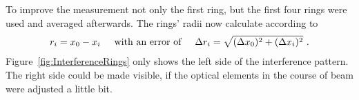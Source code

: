 To improve the measurement not only the first ring, but the first four rings were used and averaged afterwards.
The rings' radii now calculate according to
\begin{align}
	r_i = x_0 - x_i \hspace{0.5cm} \text{with an error of} \hspace{0.5cm} \Delta r_i = \sqrt{(\Delta x_0)^2 + (\Delta x_i)^2}\ .
\end{align}
Figure~\ref{fig:InterferenceRings} only shows the left side of the interference pattern. 
The right side could be made visible, if the optical elements in the course of beam were adjusted a little bit.


